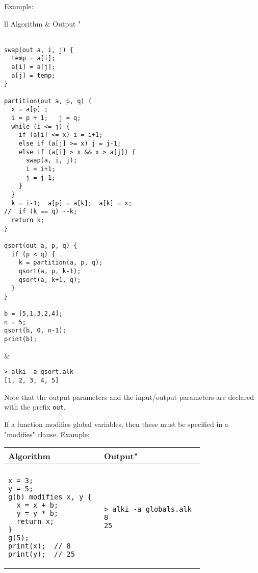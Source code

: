 \documentclass[a4paper]{report}
\begin{document}
Example:
\begin{center}
\begin{tabular}{ll}
Algorithm & Output "\\
\hline
\\
\begin{minipage}{.55\textwidth}
\begin{verbatim}
swap(out a, i, j) {
  temp = a[i];
  a[i] = a[j];
  a[j] = temp;
}

partition(out a, p, q) {
  x = a[p] ; 
  i = p + 1;   j = q;
  while (i <= j) {
    if (a[i] <= x) i = i+1;
    else if (a[j] >= x) j = j-1;
    else if (a[i] > x && x > a[j]) {
      swap(a, i, j);
      i = i+1;
      j = j-1;
    }
  }
  k = i-1;  a[p] = a[k];  a[k] = x;
//  if (k == q) --k;
  return k;
}

qsort(out a, p, q) {
  if (p < q) {
    k = partition(a, p, q);
    qsort(a, p, k-1);
    qsort(a, k+1, q);
  }
}

b = [5,1,3,2,4];
n = 5;
qsort(b, 0, n-1);
print(b);
\end{verbatim}
\end{minipage}
&
\begin{minipage}{.42\textwidth}
\begin{verbatim}
> alki -a qsort.alk 
[1, 2, 3, 4, 5]
\end{verbatim}
\end{minipage}
\end{tabular}
\end{center}
Note that the output parameters and the input/output parameters are declared with the prefix {\tt out}.

If a function modifies global variables, then these must be specified in a "modifies" clause.
Example:
\begin{center}
\begin{tabular}{ll}
Algorithm & Output"\\
\hline
\\
\begin{minipage}{.55\textwidth}
\begin{verbatim}
x = 3;
y = 5;
g(b) modifies x, y { 
  x = x + b;
  y = y * b;
  return x;
}
g(5);
print(x);  // 8
print(y);  // 25
\end{verbatim}
\end{minipage}
&
\begin{minipage}{.42\textwidth}
\begin{verbatim}
> alki -a globals.alk 
8
25
\end{verbatim}
\end{minipage}
\end{tabular}
\end{center}
\end{document}
